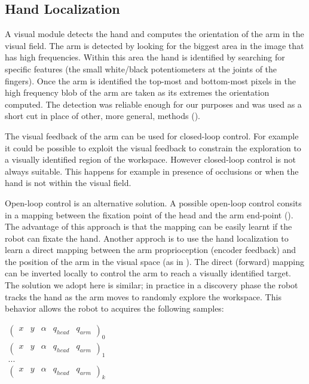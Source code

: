 \subsection{Hand Localization}
A visual module detects the hand and computes the orientation of 
the arm in the visual field. The arm is detected by looking for the 
biggest area in the image that has high frequencies. 
Within this area the hand is identified by searching for 
specific features (the small white/black potentiometers at the joints 
of the fingers). Once the arm is identified the top-most 
and bottom-most pixels in the high frequency blob of the arm 
are taken as its extremes the orientation computed.
The detection was reliable enough for our purposes and was used as a 
short cut in place of other, more general, methods (\cite{nat pasa at least}).

The visual feedback of the arm can be used for closed-loop control. For 
example it could be possible to exploit the visual feedback to constrain 
the exploration to a visually identified region of the workspace. However 
closed-loop control is not always suitable. This happens for example 
in presence of occlusions or when the hand is not within the visual field. 

Open-loop control is an alternative solution. A possible open-loop control 
consits in a mapping between the fixation point of the head and the arm 
end-point (\cite{Metta}). The advantage of this approach is that the mapping 
can be easily learnt if the robot can fixate the hand. Another approch is to
use the hand localization to learn a direct mapping between the arm 
proprioception (encoder feedback) and the position of the arm in the visual 
space (as in \cite{natale}). The direct (forward) mapping can be inverted 
locally to control the arm to reach a visually identified target. The 
solution we adopt here is similar; in practice in a discovery phase the robot
tracks the hand as the arm moves to randomly explore the workspace.
This behavior allows the robot to acquires the following samples:

\begin{center}
\begin{math}
  \begin{array}{c}
  \left(\begin{array}{ccccc}
    x & y & \alpha &q_{head} &q_{arm} \end{array}\right)_0\\
  \left(\begin{array}{ccccc}
    x & y & \alpha &q_{head} &q_{arm} \end{array}\right)_1\\
  ...\\
  \left(\begin{array}{ccccc}
    x & y & \alpha &q_{head} &q_{arm} \end{array}\right)_k\\
\end{array}
\end{math}
\end{center}

